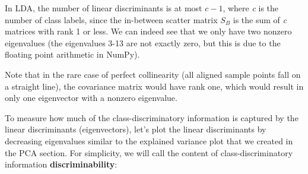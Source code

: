 \documentclass[11pt]{article}
\begin{document}
    In LDA, the number of linear discriminants is at most \(c-1\), where
\emph{c} is the number of class labels, since the in-between scatter
matrix \(S_B\) is the sum of \emph{c} matrices with rank 1 or less. We
can indeed see that we only have two nonzero eigenvalues (the
eigenvalues 3-13 are not exactly zero, but this is due to the floating
point arithmetic in NumPy).

    Note that in the rare case of perfect collinearity (all aligned sample
points fall on a straight line), the covariance matrix would have rank
one, which would result in only one eigenvector with a nonzero
eigenvalue.

To measure how much of the class-discriminatory information is captured
by the linear discriminants (eigenvectors), let's plot the linear
discriminants by decreasing eigenvalues similar to the explained
variance plot that we created in the PCA section. For simplicity, we
will call the content of class-discriminatory information
\textbf{discriminability}:
\end{document}
